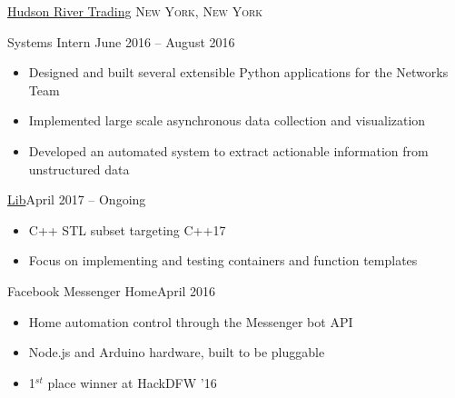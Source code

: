 \documentclass[11pt]{article}
\begin{document}
\headedsection
{\href{http://www.hudson-trading.com/}{Hudson River Trading}}
{\textsc{New York, New York}} {
  \headedsubsection
  {Systems Intern}
  {June 2016 -- August 2016}
  {
    \begin{itemize}
      \item Designed and built several extensible Python applications for the Networks Team
      \item Implemented large scale asynchronous data collection and visualization
      \item Developed an automated system to extract actionable information from unstructured data
    \end{itemize}
  }
}



\spacedhrule{0.1em}{0.9em}  %

\headedsubsection
{\href{https://github.com/wijagels/lib}{Lib}}{April 2017 -- Ongoing}
{
  \begin{itemize}[leftmargin=0.5in]
    \item{C++ STL subset targeting C++17}
    \item{Focus on implementing and testing containers and function templates}
  \end{itemize}
}

\headedsubsection
{Facebook Messenger Home}{April 2016}
{
  \begin{itemize}[leftmargin=0.5in]
    \item{Home automation control through the Messenger bot API}
    \item{Node.js and Arduino hardware, built to be pluggable}
    \item{1$^{st}$ place winner at HackDFW '16}
  \end{itemize}
}
\end{document}

